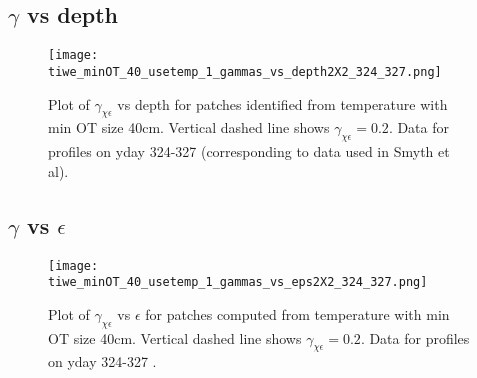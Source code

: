 \documentclass[11pt]{article}
\begin{document}
%
%
%
%
%
%
%
%








\clearpage
\subsection{$\gamma$ vs depth}


\begin{figure}[htbp]
\texttt{[image: tiwe\_minOT\_40\_usetemp\_1\_gammas\_vs\_depth2X2\_324\_327.png]}
\caption{Plot of $\gamma_{\chi\epsilon}$ vs depth for patches identified from temperature with min OT size 40cm. Vertical dashed line shows $\gamma_{\chi\epsilon}=0.2$. Data for profiles on yday 324-327 (corresponding to data used in Smyth et al).}
\label{patch_gam_vs_depth}
\end{figure}


\clearpage
\subsection{$\gamma$ vs $\epsilon$}


\begin{figure}[htbp]
\texttt{[image: tiwe\_minOT\_40\_usetemp\_1\_gammas\_vs\_eps2X2\_324\_327.png]}
\caption{Plot of $\gamma_{\chi\epsilon}$ vs $\epsilon$ for patches computed from temperature with min OT size 40cm. Vertical dashed line shows $\gamma_{\chi\epsilon}=0.2$. Data for profiles on yday 324-327 .}
\label{patch_gam_vs_eps}
\end{figure}
\end{document}
